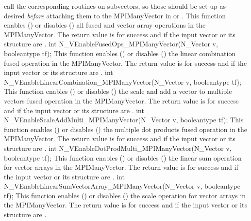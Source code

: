 call the corresponding routines on subvectors, so those should be set up
as desired \emph{before} attaching them to the MPIManyVector in
 or .
{
  This function enables () or disables () all fused and
  vector array operations in the MPIManyVector. The return value is  for
  success and  if the input vector or its  structure are .
}
{
  int N\_VEnableFusedOps\_MPIManyVector(N\_Vector v, booleantype tf);
}
{
  This function enables () or disables () the linear
  combination fused operation in the MPIManyVector. The return value is  for
  success and  if the input vector or its  structure are .
}
{
  int N\_VEnableLinearCombination\_MPIManyVector(N\_Vector v, booleantype tf);
}
{
  This function enables () or disables () the scale and
  add a vector to multiple vectors fused operation in the MPIManyVector. The
  return value is  for success and  if the input vector or its
   structure are .
}
{
  int N\_VEnableScaleAddMulti\_MPIManyVector(N\_Vector v, booleantype tf);
}
{
  This function enables () or disables () the multiple
  dot products fused operation in the MPIManyVector. The return value is 
  for success and  if the input vector or its  structure are
  .
}
{
  int N\_VEnableDotProdMulti\_MPIManyVector(N\_Vector v, booleantype tf);
}
{
  This function enables () or disables () the linear sum
  operation for vector arrays in the MPIManyVector. The return value is  for
  success and  if the input vector or its  structure are .
}
{
  int N\_VEnableLinearSumVectorArray\_MPIManyVector(N\_Vector v, booleantype tf);
}
{
  This function enables () or disables () the scale
  operation for vector arrays in the MPIManyVector. The return value is  for
  success and  if the input vector or its  structure are .
}
